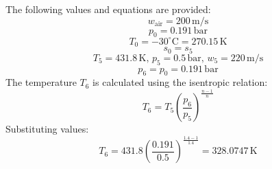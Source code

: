 The following values and equations are provided:  
\[
w_{\text{air}} = 200 \, \text{m/s}
\]
\[
p_0 = 0.191 \, \text{bar}
\]
\[
T_0 = -30^\circ\text{C} = 270.15 \, \text{K}
\]
\[
s_0 = s_5
\]
\[
T_5 = 431.8 \, \text{K}, \, p_5 = 0.5 \, \text{bar}, \, w_5 = 220 \, \text{m/s}
\]
\[
p_6 = p_0 = 0.191 \, \text{bar}
\]
The temperature \( T_6 \) is calculated using the isentropic relation:  
\[
T_6 = T_5 \left( \frac{p_6}{p_5} \right)^{\frac{n-1}{n}}
\]
Substituting values:  
\[
T_6 = 431.8 \left( \frac{0.191}{0.5} \right)^{\frac{1.4-1}{1.4}} = 328.0747 \, \text{K}
\]
